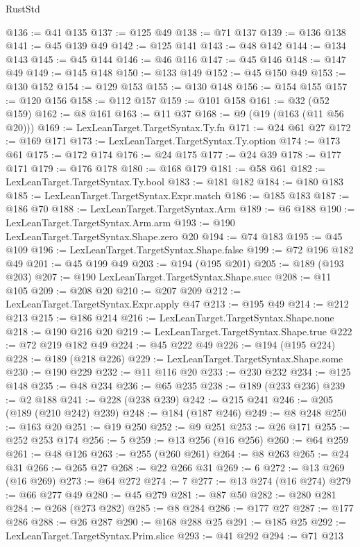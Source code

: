 \begin{lexlean}{RustStd}
\begin{coremodule}
@136 := @41 @135
@137 := @125 @49
@138 := @71 @137
@139 := @136 @138
@141 := @45 @139 @49
@142 := @125 @141
@143 := @48 @142
@144 := @134 @143
@145 := @45 @144
@146 := @46 @116
@147 := @45 @146
@148 := @147 @49
@149 := @145 @148
@150 := @133 @149
@152 := @45 @150 @49
@153 := @130 @152
@154 := @129 @153
@155 := @130 @148
@156 := @154 @155
@157 := @120 @156
@158 := @112 @157
@159 := @101 @158
@161 := @32 (@52 @159)
@162 := @8 @161
@163 := @11 @37
@168 := @9 (@19 (@163 (@11 @56 @20)))
@169 := LexLeanTarget.TargetSyntax.Ty.fn
@171 := @24 @61 @27
@172 := @169 @171
@173 := LexLeanTarget.TargetSyntax.Ty.option
@174 := @173 @61
@175 := @172 @174
@176 := @24 @175
@177 := @24 @39
@178 := @177 @171
@179 := @176 @178
@180 := @168 @179
@181 := @58 @61
@182 := LexLeanTarget.TargetSyntax.Ty.bool
@183 := @181 @182
@184 := @180 @183
@185 := LexLeanTarget.TargetSyntax.Expr.match
@186 := @185 @183
@187 := @186 @70
@188 := LexLeanTarget.TargetSyntax.Arm
@189 := @6 @188
@190 := LexLeanTarget.TargetSyntax.Arm.arm
@193 := @190 LexLeanTarget.TargetSyntax.Shape.zero @20
@194 := @74 @183
@195 := @45 @109
@196 := LexLeanTarget.TargetSyntax.Shape.false
@199 := @72 @196 @182 @49
@201 := @45 @199 @49
@203 := @194 (@195 @201)
@205 := @189 (@193 @203)
@207 := @190 LexLeanTarget.TargetSyntax.Shape.succ
@208 := @11 @105
@209 := @208 @20
@210 := @207 @209
@212 := LexLeanTarget.TargetSyntax.Expr.apply @47
@213 := @195 @49
@214 := @212 @213
@215 := @186 @214
@216 := LexLeanTarget.TargetSyntax.Shape.none
@218 := @190 @216 @20
@219 := LexLeanTarget.TargetSyntax.Shape.true
@222 := @72 @219 @182 @49
@224 := @45 @222 @49
@226 := @194 (@195 @224)
@228 := @189 (@218 @226)
@229 := LexLeanTarget.TargetSyntax.Shape.some
@230 := @190 @229
@232 := @11 @116 @20
@233 := @230 @232
@234 := @125 @148
@235 := @48 @234
@236 := @65 @235
@238 := @189 (@233 @236)
@239 := @2 @188
@241 := @228 (@238 @239)
@242 := @215 @241
@246 := @205 (@189 (@210 @242) @239)
@248 := @184 (@187 @246)
@249 := @8 @248
@250 := @163 @20
@251 := @19 @250
@252 := @9 @251
@253 := @26 @171
@255 := @252 @253 @174
@256 := 5
@259 := @13 @256 (@16 @256)
@260 := @64 @259
@261 := @48 @126
@263 := @255 (@260 @261)
@264 := @8 @263
@265 := @24 @31
@266 := @265 @27
@268 := @22 @266 @31
@269 := 6
@272 := @13 @269 (@16 @269)
@273 := @64 @272
@274 := 7
@277 := @13 @274 (@16 @274)
@279 := @66 @277 @49
@280 := @45 @279
@281 := @87 @50
@282 := @280 @281
@284 := @268 (@273 @282)
@285 := @8 @284
@286 := @177 @27
@287 := @177 @286
@288 := @26 @287
@290 := @168 @288 @25
@291 := @185 @25
@292 := LexLeanTarget.TargetSyntax.Prim.slice
@293 := @41 @292
@294 := @71 @213

\end{coremodule}
\end{lexlean}
